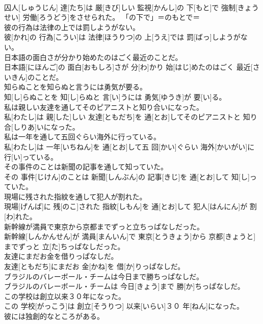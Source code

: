 \documentclass[8pt]{extreport}
\begin{document}
\begin{CJK}{UTF8}{min}
\\	囚人[しゅうじん] 達[たち]は 厳[きび]しい 監視[かんし]の 下[もと]で 強制[きょうせい] 労働[ろうどう]をさせられた。	「の下で」＝のもとで＝ 
\\	彼の行為は法律の上では罰しようがない。	
\\	彼[かれ]の 行為[こうい]は 法律[ほうりつ]の 上[うえ]では 罰[ばっ]しようがない。	
\\	日本語の面白さが分かり始めたのはごく最近のことだ。	
\\	日本語[にほんご]の 面白[おもしろ]さが 分[わ]かり 始[はじ]めたのはごく 最近[さいきん]のことだ。	
\\	知らぬことを知らぬと言うには勇気が要る。	
\\	知[し]らぬことを 知[し]らぬと 言[い]うには 勇気[ゆうき]が 要[い]る。	
\\	私は親しい友達を通してそのピアニストと知り合いになった。	
\\	私[わたし]は 親[した]しい 友達[ともだち]を 通[とお]してそのピアニストと 知り合[しりあ]いになった。	
\\	私は一年を通して五回ぐらい海外に行っている。	
\\	私[わたし]は 一年[いちねん]を 通[とお]して五 回[かい]ぐらい 海外[かいがい]に 行[い]っている。	
\\	その事件のことは新聞の記事を通して知っていた。	
\\	その 事件[じけん]のことは 新聞[しんぶん]の 記事[きじ]を 通[とお]して 知[し]っていた。	
\\	現場に残された指紋を通して犯人が割れた。	
\\	現場[げんば]に 残[のこ]された 指紋[しもん]を 通[とお]して 犯人[はんにん]が 割[わ]れた。	
\\	新幹線が満員で東京から京都までずっと立ちっぱなしだった。	
\\	新幹線[しんかんせん]が 満員[まんいん]で 東京[とうきょう]から 京都[きょうと]までずっと 立[た]ちっぱなしだった。	
\\	友達にまだお金を借りっぱなしだ。	
\\	友達[ともだち]にまだお 金[かね]を 借[か]りっぱなしだ。	
\\	ブラジルのバレーボール・チームは今日まで勝ちっぱなしだ。	
\\	ブラジルのバレーボール・チームは 今日[きょう]まで 勝[か]ちっぱなしだ。	
\\	この学校は創立以来３０年になった。	
\\	この 学校[がっこう]は 創立[そうりつ] 以来[いらい]３０ 年[ねん]になった。	
\\	彼には独創的なところがある。	

\end{CJK}
\end{document}
